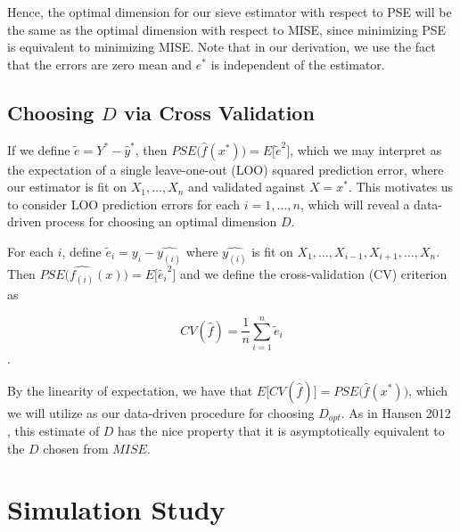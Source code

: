 \documentclass[12pt]{article}  %
\begin{document}
Hence, the optimal dimension for our sieve estimator with respect to PSE will be the same as the optimal dimension with respect to MISE, since minimizing PSE is equivalent to minimizing MISE. Note that in our derivation, we use the fact that the errors are zero mean and $e^*$ is independent of the estimator. 

\subsection{Choosing $D$ via Cross Validation}

If we define $\tilde{e} = Y^* - \hat{y}^*$, then $PSE\Big(\hat{f}(x^*)\Big) = E\big[\tilde{e}^2\big]$, which we may interpret as the expectation of a single leave-one-out (LOO) squared prediction error, where our estimator is fit on $X_1, \ldots, X_n$ and validated against $X = x^*$. This motivates us to consider LOO prediction errors for each $i = 1, \ldots, n$, which will reveal a data-driven process for choosing an optimal dimension $D$.

For each $i$, define $\tilde{e}_i = y_i - \hat{y_{(i)}}$ where $\hat{y_{(i)}}$ is fit on $X_1, \ldots, X_{i-1}, X_{i+1}, \ldots, X_n$. Then $PSE\Big(\hat{f_{(i)}}(x)\Big) = E\big[\tilde{e_i}^2\big]$ and we define the cross-validation (CV) criterion as

$$CV(\hat{f}) = \frac{1}{n}\sum_{i=1}^n \tilde{e}_i$$.

By the linearity of expectation, we have that $E\Big[CV(\hat{f})\Big] = PSE\Big(\hat{f}(x^*)\Big)$, which we will utilize as our data-driven procedure for choosing $D_{opt}$. As in Hansen 2012 \cite{Hansen}, this estimate of $D$ has the nice property that it is asymptotically equivalent to the $D$ chosen from $MISE$.
\section{Simulation Study}
\end{document}
